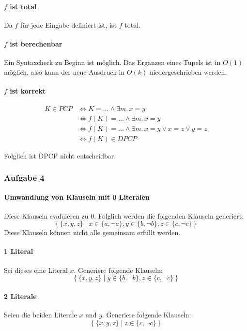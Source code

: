\paragraph{$f$ ist total} Da $f$ für jede Eingabe definiert ist, ist $f$ total.
\par

\paragraph{$f$ ist berechenbar} Ein Syntaxcheck zu Beginn ist möglich. Das
Ergänzen eines Tupels ist in $O(1)$ möglich, also kann der neue Ausdruck in
$O(k)$ niedergeschrieben werden.
\par

\paragraph{$f$ ist korrekt}
\begin{align*}
	K \in PCP &\iff K = \ldots \land \exists m.\, x = y \\
		  &\iff f(K) = \ldots \land \exists m.\, x = y\\
		  &\iff f(K) = \ldots \land \exists m.\, x = y \lor x = z \lor y
		  = z \\
		  &\iff f(K) \in DPCP
\end{align*}

Folglich ist DPCP nicht entscheidbar.

\subsubsection{Aufgabe 4}

\paragraph{Umwandlung von Klauseln mit 0 Literalen}
Diese Klauseln evaluieren zu $0$. Folglich werden die folgenden Klauseln
generiert:
\[
	\left\{\{x,y,z\} \mid x \in \{a,\lnot a\}, y \in \{b,\lnot b\}, z \in
	\{c,\lnot c\}\right\}
\]
Diese Klauseln können nicht alle gemeinsam erfüllt werden.
\par
\paragraph{1 Literal}
Sei dieses eine Literal $x$. Generiere folgende Klauseln:
\[
	\left\{\{x,y,z\} \mid y \in \{b,\lnot b\}, z \in
	\{c,\lnot c\}\right\}
\]
\par
\paragraph{2 Literale}
Seien die beiden Literale $x$ und $y$. Generiere folgende Klauseln:
\[
	\left\{\{x,y,z\} \mid z \in
	\{c,\lnot c\}\right\}
\]
\par
